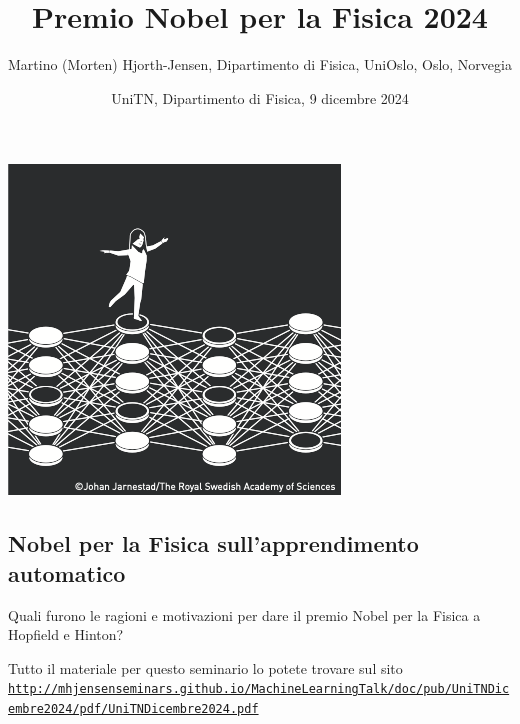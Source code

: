 \documentclass[%
oneside,                 %
final,                   %
10pt]{article}
\begin{document}

\newcommand{\exercisesection}[1]{\subsection*{#1}}






\title{Premio Nobel per la  Fisica 2024}


\author{Martino (Morten) Hjorth-Jensen, Dipartimento di Fisica, UniOslo, Oslo, Norvegia\inst{}}
\institute{}

\date{UniTN, Dipartimento di Fisica, 9 dicembre 2024
}

\vspace{6mm}

\centerline{\includegraphics[width=0.45\linewidth]{figures/nnillustration.png}}

\vspace{6mm}

\subsection{Nobel per la  Fisica  sull'apprendimento automatico}

\begin{block}{}
Quali furono le ragioni e motivazioni per dare  il premio Nobel per la Fisica a Hopfield e Hinton? 
\end{block}

\begin{block}{}
Tutto il materiale per questo seminario lo potete trovare sul sito  \href{{http://mhjensenseminars.github.io/MachineLearningTalk/doc/pub/UniTNDicembre2024/pdf/UniTNDicembre2024.pdf}}{\nolinkurl{http://mhjensenseminars.github.io/MachineLearningTalk/doc/pub/UniTNDicembre2024/pdf/UniTNDicembre2024.pdf}}
\end{block}
\end{document}
